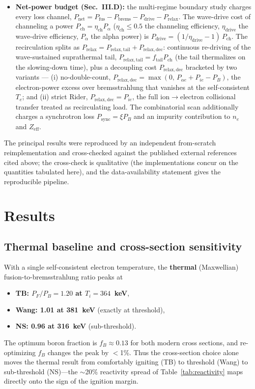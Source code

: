 \documentclass[aip,pop,reprint,amsmath,amssymb,floatfix]{revtex4-2}
\begin{document}
\begin{itemize}
\item \textbf{Net-power budget (Sec.~III.D):} the multi-regime boundary study charges every loss channel, $P_\mathrm{net} = P_\mathrm{fus} - P_\mathrm{brems} - P_\mathrm{drive} - P_\mathrm{relax}$. The wave-drive cost of channeling a power $P_\mathrm{ch} = \eta_\mathrm{ch} P_\alpha$ ($\eta_\mathrm{ch} \le 0.5$ the channeling efficiency, $\eta_\mathrm{drive}$ the wave-drive efficiency, $P_\alpha$ the alpha power) is $P_\mathrm{drive} = (1/\eta_\mathrm{drive} - 1)\,P_\mathrm{ch}$. The recirculation splits as $P_\mathrm{relax} = P_\mathrm{relax,tail} + P_\mathrm{relax,dec}$: continuous re-driving of the wave-sustained suprathermal tail, $P_\mathrm{relax,tail} = f_\mathrm{tail} P_\mathrm{ch}$ (the tail thermalizes on the slowing-down time), plus a decoupling cost $P_\mathrm{relax,dec}$ bracketed by two variants --- (i) no-double-count, $P_\mathrm{relax,dec} = \max(0,\, P_{\alpha e} + P_{ie} - P_B)$, the electron-power excess over bremsstrahlung that vanishes at the self-consistent $T_e$; and (ii) strict Rider, $P_\mathrm{relax,dec} = P_{ie}$, the full ion$\to$electron collisional transfer treated as recirculating load. The combinatorial scan additionally charges a synchrotron loss $P_\mathrm{sync} = \xi P_B$ and an impurity contribution to $n_e$ and $Z_\mathrm{eff}$.
\end{itemize}

The principal results were reproduced by an independent from-scratch reimplementation and cross-checked against the published external references cited above; the cross-check is qualitative (the implementations concur on the quantities tabulated here), and the data-availability statement gives the reproducible pipeline.

\section{Results}

\subsection{Thermal baseline and cross-section sensitivity}

With a single self-consistent electron temperature, the \textbf{thermal} (Maxwellian) fusion-to-bremsstrahlung ratio peaks at
\begin{itemize}
\item \textbf{TB: $P_F/P_B = 1.20$ at $T_i = 364$~keV},
\item \textbf{Wang: 1.01 at 381~keV} (exactly at threshold),
\item \textbf{NS: 0.96 at 316~keV} (sub-threshold).
\end{itemize}
The optimum boron fraction is $f_B \approx 0.13$ for both modern cross sections, and re-optimizing $f_B$ changes the peak by $<$1\%. Thus the cross-section choice alone moves the thermal result from comfortably igniting (TB) to threshold (Wang) to sub-threshold (NS)---the $\sim$20\% reactivity spread of Table~\ref{tab:reactivity} maps directly onto the sign of the ignition margin.
\end{document}
